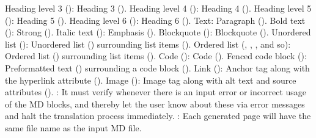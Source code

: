 \markdownRendererUlItem Heading level 3 (\markdownRendererCodeSpan{\markdownRendererHash{}\markdownRendererHash{}\markdownRendererHash{}}): Heading 3 ().\markdownRendererUlItemEnd 
\markdownRendererUlItem Heading level 4 (\markdownRendererCodeSpan{\markdownRendererHash{}\markdownRendererHash{}\markdownRendererHash{}\markdownRendererHash{}}): Heading 4 ().\markdownRendererUlItemEnd 
\markdownRendererUlItem Heading level 5 (\markdownRendererCodeSpan{\markdownRendererHash{}\markdownRendererHash{}\markdownRendererHash{}\markdownRendererHash{}\markdownRendererHash{}}): Heading 5 ().\markdownRendererUlItemEnd 
\markdownRendererUlItem Heading level 6 (\markdownRendererCodeSpan{\markdownRendererHash{}\markdownRendererHash{}\markdownRendererHash{}\markdownRendererHash{}\markdownRendererHash{}\markdownRendererHash{}}): Heading 6 ().\markdownRendererUlItemEnd 
\markdownRendererUlItem Text: Paragraph ().\markdownRendererUlItemEnd 
\markdownRendererUlItem Bold text (): Strong ().\markdownRendererUlItemEnd 
\markdownRendererUlItem Italic text (): Emphasis ().\markdownRendererUlItemEnd 
\markdownRendererUlItem Blockquote (\markdownRendererCodeSpan{>}): Blockquote ().\markdownRendererUlItemEnd 
\markdownRendererUlItem Unordered list (\markdownRendererCodeSpan{-}): Unordered list () surrounding list items ().\markdownRendererUlItemEnd 
\markdownRendererUlItem Ordered list (, , , and so): Ordered list () surrounding list items ().\markdownRendererUlItemEnd 
\markdownRendererUlItem Code (): Code ().\markdownRendererUlItemEnd 
\markdownRendererUlItem Fenced code block (): Preformatted text () surrounding a code block ().\markdownRendererUlItemEnd 
\markdownRendererUlItem Link (): Anchor tag along with the hyperlink attribute ().\markdownRendererUlItemEnd 
\markdownRendererUlItem Image (): Image tag along with alt text and source attributes ().\markdownRendererUlItemEnd 
\markdownRendererUlEndTight \markdownRendererInterblockSeparator
{}: It must verify whenever there is an input error or incorrect usage of the MD blocks, and thereby let the user know about these via error messages and halt the translation process immediately.\markdownRendererInterblockSeparator
{}: Each generated page will have the same file name as the input MD file. \markdownRendererDocumentEnd